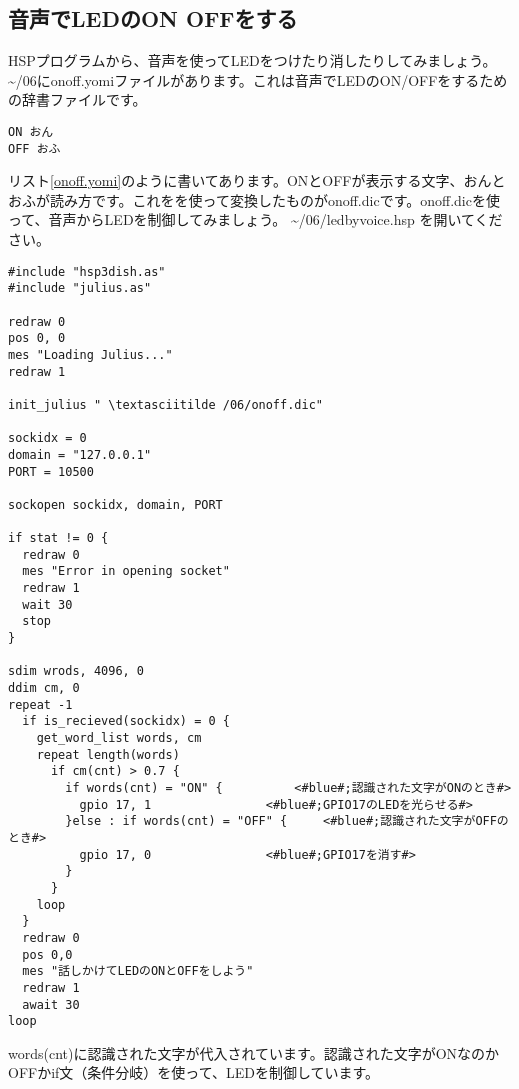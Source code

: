 \subsection{音声でLEDのON OFFをする}
HSPプログラムから、音声を使ってLEDをつけたり消したりしてみましょう。 \textasciitilde /06にonoff.yomiファイルがあります。これは音声でLEDのON/OFFをするための辞書ファイルです。\\

\begin{lstlisting}[caption=onoff.yomi,label=onoff.yomi]
ON おん
OFF おふ
\end{lstlisting}

リスト\ref{onoff.yomi}のように書いてあります。ONとOFFが表示する文字、おんとおふが読み方です。これをを使って変換したものがonoff.dicです。onoff.dicを使って、音声からLEDを制御してみましょう。 \textasciitilde /06/ledbyvoice.hsp を開いてください。\\

\begin{lstlisting}[caption=ledvoice.hsp,label=ledvoice.hsp]
#include "hsp3dish.as"
#include "julius.as"

redraw 0
pos 0, 0
mes "Loading Julius..."
redraw 1

init_julius " \textasciitilde /06/onoff.dic"

sockidx = 0
domain = "127.0.0.1"
PORT = 10500

sockopen sockidx, domain, PORT

if stat != 0 {
  redraw 0
  mes "Error in opening socket"
  redraw 1
  wait 30
  stop
}

sdim wrods, 4096, 0
ddim cm, 0
repeat -1
  if is_recieved(sockidx) = 0 {
    get_word_list words, cm
    repeat length(words)
      if cm(cnt) > 0.7 {
        if words(cnt) = "ON" {			<#blue#;認識された文字がONのとき#>
          gpio 17, 1				<#blue#;GPIO17のLEDを光らせる#>
        }else : if words(cnt) = "OFF" {		<#blue#;認識された文字がOFFのとき#>
          gpio 17, 0				<#blue#;GPIO17を消す#>
        }
      }
    loop
  }
  redraw 0
  pos 0,0
  mes "話しかけてLEDのONとOFFをしよう"
  redraw 1
  await 30
loop
\end{lstlisting}

words(cnt)に認識された文字が代入されています。認識された文字がONなのかOFFかif文（条件分岐）を使って、LEDを制御しています。\\

\begin{tcolorbox}[title=\useOmetoi]
\begin{enumerate}
\end{enumerate}
\end{tcolorbox}
